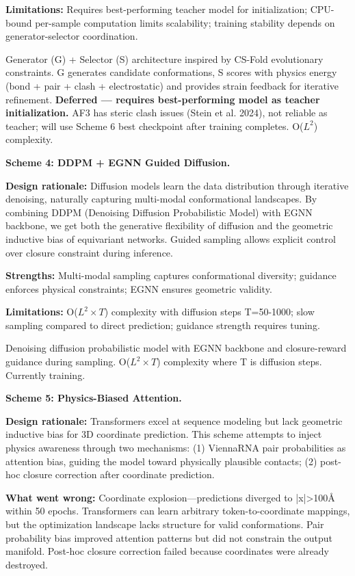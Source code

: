 \documentclass[12pt]{article}
\begin{document}
\textbf{Limitations:} Requires best-performing teacher model for initialization; CPU-bound per-sample computation limits scalability; training stability depends on generator-selector coordination.

Generator (G) + Selector (S) architecture inspired by CS-Fold evolutionary constraints. G generates candidate conformations, S scores with physics energy (bond + pair + clash + electrostatic) and provides strain feedback for iterative refinement. \textbf{Deferred — requires best-performing model as teacher initialization.} AF3 has steric clash issues (Stein et al. 2024), not reliable as teacher; will use Scheme 6 best checkpoint after training completes. O($L^2$) complexity.

\textbf{Scheme 4: DDPM + EGNN Guided Diffusion.}

\textbf{Design rationale:} Diffusion models learn the data distribution through iterative denoising, naturally capturing multi-modal conformational landscapes. By combining DDPM (Denoising Diffusion Probabilistic Model) \citep{ho2020} with EGNN backbone, we get both the generative flexibility of diffusion and the geometric inductive bias of equivariant networks. Guided sampling allows explicit control over closure constraint during inference.

\textbf{Strengths:} Multi-modal sampling captures conformational diversity; guidance enforces physical constraints; EGNN ensures geometric validity.

\textbf{Limitations:} O($L^2 \times T$) complexity with diffusion steps T=50-1000; slow sampling compared to direct prediction; guidance strength requires tuning.

Denoising diffusion probabilistic model \citep{ho2020} with EGNN backbone and closure-reward guidance during sampling. O($L^2 \times T$) complexity where T is diffusion steps. Currently training.

\textbf{Scheme 5: Physics-Biased Attention.}

\textbf{Design rationale:} Transformers excel at sequence modeling but lack geometric inductive bias for 3D coordinate prediction. This scheme attempts to inject physics awareness through two mechanisms: (1) ViennaRNA pair probabilities as attention bias, guiding the model toward physically plausible contacts; (2) post-hoc closure correction after coordinate prediction.

\textbf{What went wrong:} Coordinate explosion---predictions diverged to |x|>100Å within 50 epochs. Transformers can learn arbitrary token-to-coordinate mappings, but the optimization landscape lacks structure for valid conformations. Pair probability bias improved attention patterns but did not constrain the output manifold. Post-hoc closure correction failed because coordinates were already destroyed.
\end{document}
